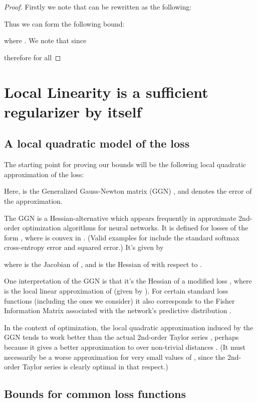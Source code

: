 \documentclass{article}
\theoremstyle{plain}
\theoremstyle{definition}
\theoremstyle{remark}
\begin{document}
\begin{proof}
Firstly we note that  can be rewritten as the following: 

Thus we can form the following bound:

where . We note that since

therefore for all 

\end{proof}
\section{Local Linearity  is a sufficient regularizer by itself}\label{ap:bounds_on_beta}
\subsection{A local quadratic model of the loss}

The starting point for proving our bounds will be the following local
quadratic approximation of the loss:

Here,  is the Generalized Gauss-Newton matrix (GGN) \citep{schraudolph2002fast, martens2014new}, and  denotes the error of the approximation.

The GGN is a Hessian-alternative which appears frequently in approximate
2nd-order optimization algorithms for neural networks. It is defined for
losses of the form , where  is convex
in . (Valid examples for  include the standard softmax
cross-entropy error and squared error.) It's given by

where  is the Jacobian of , and  is the Hessian of 
with respect to .

One interpretation of the GGN is that it's the Hessian of a modified loss
, where  is the local
linear approximation of  (given by ). 
For certain standard loss functions (including the ones we consider) it
also corresponds to the Fisher Information Matrix associated with the
network's predictive distribution \citep{martens2014new}.

In the context of optimization, the local quadratic approximation induced by
the GGN tends to work better than the actual 2nd-order Taylor series \citep[e.g.][]{martens2010deep}, perhaps
because it gives a better approximation to  over
non-trivial distances \citep{martens2014new}. (It must necessarily be a worse approximation for very small values of , since the 2nd-order Taylor series is clearly optimal in that respect.)

\subsection{Bounds for common loss functions}
\end{document}
